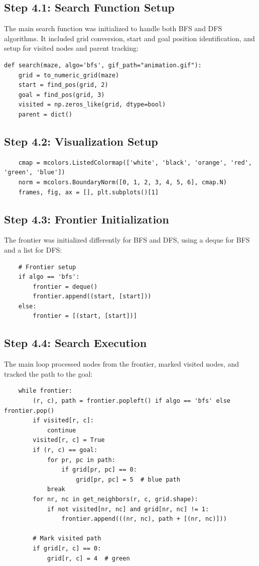 \documentclass[a4paper, journal]{IEEEtran}
\begin{document}
\subsection*{Step 4.1: Search Function Setup}
The main search function was initialized to handle both BFS and DFS algorithms. It included grid conversion, start and goal position identification, and setup for visited nodes and parent tracking:
\begin{lstlisting}
def search(maze, algo='bfs', gif_path="animation.gif"):
    grid = to_numeric_grid(maze)
    start = find_pos(grid, 2)
    goal = find_pos(grid, 3)
    visited = np.zeros_like(grid, dtype=bool)
    parent = dict()
\end{lstlisting}

\subsection*{Step 4.2: Visualization Setup}
\begin{lstlisting}
    cmap = mcolors.ListedColormap(['white', 'black', 'orange', 'red', 'green', 'blue'])
    norm = mcolors.BoundaryNorm([0, 1, 2, 3, 4, 5, 6], cmap.N)
    frames, fig, ax = [], plt.subplots()[1]
\end{lstlisting}

\subsection*{Step 4.3: Frontier Initialization}
The frontier was initialized differently for BFS and DFS, using a deque for BFS and a list for DFS:
\begin{lstlisting}
    # Frontier setup
    if algo == 'bfs':
        frontier = deque()
        frontier.append((start, [start]))
    else:
        frontier = [(start, [start])]
\end{lstlisting}

\subsection*{Step 4.4: Search Execution}
The main loop processed nodes from the frontier, marked visited nodes, and tracked the path to the goal:
\begin{lstlisting}
    while frontier:
        (r, c), path = frontier.popleft() if algo == 'bfs' else frontier.pop()
        if visited[r, c]:
            continue
        visited[r, c] = True
        if (r, c) == goal:
            for pr, pc in path:
                if grid[pr, pc] == 0:
                    grid[pr, pc] = 5  # blue path
            break
        for nr, nc in get_neighbors(r, c, grid.shape):
            if not visited[nr, nc] and grid[nr, nc] != 1:
                frontier.append(((nr, nc), path + [(nr, nc)]))

        # Mark visited path
        if grid[r, c] == 0:
            grid[r, c] = 4  # green
\end{lstlisting}
\end{document}
